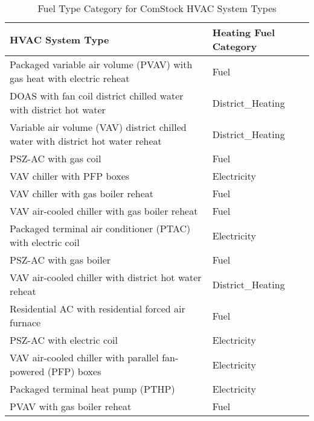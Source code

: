 \begin{table}[hb!]
\small
\centering
\caption[Fuel Type Category for ComStock HVAC System Types]{Fuel Type Category for ComStock HVAC System Types}
\label{tab:hvac_system_heating_fuel_categories}
\begin{tabular}{|l|l|}
\hline
\textbf{HVAC System Type}                                   & \textbf{Heating Fuel Category} \\ \hline
Packaged variable air volume (PVAV) with gas heat with electric reheat                     & Fuel                           \\ \hline
DOAS with fan coil district chilled water with district hot water & District\_Heating        \\ \hline
Variable air volume (VAV) district chilled water with district hot water reheat         & District\_Heating        \\ \hline
PSZ-AC with gas coil                                        & Fuel                           \\ \hline
VAV chiller with PFP boxes                                  & Electricity                    \\ \hline
VAV chiller with gas boiler reheat                          & Fuel                           \\ \hline
VAV air-cooled chiller with gas boiler reheat               & Fuel                           \\ \hline
Packaged terminal air conditioner (PTAC) with electric coil                                     & Electricity                    \\ \hline
PSZ-AC with gas boiler                                      & Fuel                           \\ \hline
VAV air-cooled chiller with district hot water reheat       & District\_Heating              \\ \hline
Residential AC with residential forced air furnace          & Fuel                           \\ \hline
PSZ-AC with electric coil                                   & Electricity                    \\ \hline
VAV air-cooled chiller with parallel fan-powered (PFP) boxes                       & Electricity                    \\ \hline
Packaged terminal heat pump (PTHP)                                                        & Electricity                    \\ \hline
PVAV with gas boiler reheat                                 & Fuel                           \\ \hline

\end{tabular}
\end{table}
